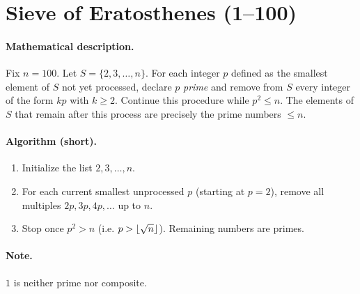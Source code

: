 \documentclass[10pt]{article}
\theoremstyle{definition}
\theoremstyle{plain}
\numberwithin{equation}{section}
\begin{document}


\section*{Sieve of Eratosthenes (1--100)}

\paragraph{Mathematical description.}
Fix \(n=100\). Let \(S=\{2,3,\dots,n\}\). For each integer \(p\) 
defined as the smallest element of \(S\) not yet processed, declare 
\(p\) \emph{prime} and remove from \(S\) every integer of the 
form \(kp\) with \(k\ge 2\). Continue this procedure while 
\(p^2 \le n\). The elements of \(S\) that remain after this process 
are precisely the prime numbers \(\le n\).

\paragraph{Algorithm (short).}
\begin{enumerate}
  \item Initialize the list \(2,3,\dots,n\).
  \item For each current smallest unprocessed \(p\) 
  (starting at \(p=2\)), remove all multiples 
  \(2p,3p,4p,\dots\) up to \(n\).
  \item Stop once \(p^2>n\) (i.e. \(p>\FLOOR{\sqrt{n}}\)). 
  Remaining numbers are primes.
\end{enumerate}

\paragraph{Note.} \(1\) is neither prime nor composite.
\end{document}
